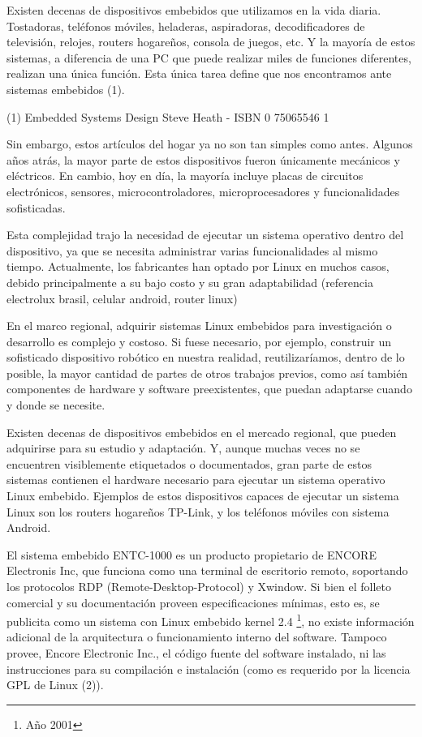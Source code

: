 \documentclass[conference]{IEEEtran}
\begin{document}
Existen decenas de dispositivos embebidos que utilizamos en la vida diaria.
Tostadoras, teléfonos móviles, heladeras, aspiradoras,
decodificadores de televisión, relojes, routers hogareños, consola de juegos, etc.
Y la mayoría de estos sistemas, a diferencia de una PC que puede
realizar miles de funciones diferentes, realizan una única función.
Esta única tarea define que nos encontramos ante sistemas embebidos (1).

(1)
Embedded Systems Design
Steve Heath - ISBN 0 75065546 1


Sin embargo, estos artículos del hogar ya no son tan simples como antes. Algunos
años atrás, la mayor parte de estos dispositivos fueron únicamente mecánicos
y eléctricos. En cambio, hoy en día, la mayoría incluye placas
de circuitos electrónicos, sensores, microcontroladores, microprocesadores y
funcionalidades sofisticadas.

Esta complejidad trajo la necesidad de ejecutar un sistema operativo
dentro del dispositivo, ya
que se necesita administrar varias funcionalidades al mismo tiempo.
Actualmente, los fabricantes han optado por Linux en muchos
casos, debido principalmente a su
bajo costo y su gran adaptabilidad (referencia electrolux brasil, celular android, router linux)

En el marco regional, adquirir sistemas Linux embebidos para investigación
o desarrollo es complejo y costoso.
Si fuese necesario, por ejemplo, construir un sofisticado dispositivo robótico
en nuestra realidad, reutilizaríamos, dentro de lo posible, la mayor cantidad de partes de otros
trabajos previos, como así también componentes de hardware y software
preexistentes, que puedan adaptarse cuando y donde se necesite.

Existen decenas de dispositivos embebidos en el mercado regional,
que pueden adquirirse para su estudio y adaptación. Y,
aunque muchas veces no se encuentren visiblemente etiquetados o documentados,
gran parte de estos sistemas contienen el hardware necesario
para ejecutar un sistema operativo Linux embebido. Ejemplos de estos dispositivos
capaces de ejecutar un sistema Linux son los routers hogareños TP-Link,
y los teléfonos móviles con sistema Android.

El sistema embebido ENTC-1000 es un producto propietario de ENCORE Electronis Inc,
que funciona como una terminal de escritorio remoto, soportando
los protocolos RDP (Remote-Desktop-Protocol) y Xwindow. Si bien el folleto
comercial y su documentación proveen especificaciones mínimas,
esto es, se publicita como un sistema con Linux embebido kernel 2.4 
\footnote{Año 2001}, no existe información adicional de la arquitectura o funcionamiento
interno del software. Tampoco provee, Encore Electronic Inc.,
el código fuente del software instalado, ni las instrucciones
para su compilación e instalación (como es requerido por la licencia GPL de Linux (2)).
\end{document}
